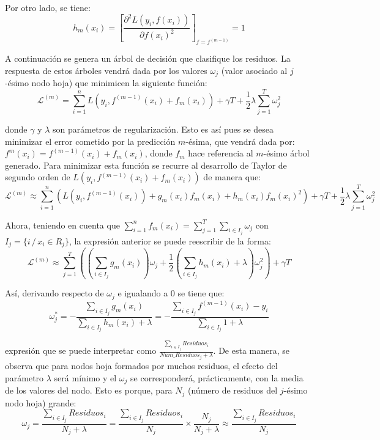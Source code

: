 \documentclass[12pt,twoside]{article}
\begin{document}
Por otro lado, se tiene:
\begin{equation*}
h_{m}(x_i) = \left[ \frac{\partial^2 L(y_i, f(x_i))}{\partial f(x_i)^2} \right]_{f = f^{(m-1)}} = 1
\end{equation*}

A continuación se genera un árbol de decisión que clasifique los residuos. La respuesta de estos árboles vendrá dada por los valores $\omega_j$ (valor asociado al $j$-ésimo nodo hoja) que minimicen la siguiente función:
\begin{equation*}
\mathcal{L}^{(m)} = \sum_{i=1}^n L(y_i, f^{(m-1)}(x_i) + f_m(x_i)) + \gamma T + \frac{1}{2}\lambda \sum_{j=1}^T \omega_j^2
\end{equation*}

\noindent
donde $\gamma$ y $\lambda$ son parámetros de regularización. Esto es así pues se desea minimizar el error cometido por la predicción $m$-ésima, que vendrá dada por: $f^m(x_i) = f^{(m-1)}(x_i) + f_m(x_i)$, donde $f_m$ hace referencia al $m$-ésimo árbol generado. Para minimizar esta función se recurre al desarrollo de Taylor de segundo orden de $L(y_i, f{^{(m-1)}}(x_i) + f_m(x_i))$ de manera que:
\begin{equation*}
\mathcal{L}^{(m)} \approx \sum_{i=1}^n \left( L(y_i, f^{(m-1)}(x_i)) + g_m(x_i)f_m(x_i) + h_m(x_i)f_m(x_i)^2 \right)  + \gamma T + \frac{1}{2}\lambda \sum_{j=1}^T \omega_j^2
\end{equation*}

Ahora, teniendo en cuenta que $ \displaystyle \sum_{i=1}^n f_m(x_i) = \sum_{j = 1}^T\sum_{i \in I_j} \omega_j$ con $I_j = \{ i \, / \, x_i \in R_j \}$, la expresión anterior se puede reescribir de la forma:
\begin{equation*}
\mathcal{L}^{(m)} \approx \sum_{j = 1}^T \left( (\sum_{i \in I_j} g_m(x_i))\omega_j + \frac{1}{2}(\sum_{i\in I_j} h_m(x_i) + \lambda)\omega_j^2 \right) + \gamma T
\end{equation*}

Así, derivando respecto de $\omega_j$ e igualando a 0 se tiene que:
\begin{equation*}
\omega_j^* = - \frac{\sum_{i \in I_j} g_m(x_i)}{\sum_{i \in I_j} h_m(x_i) + \lambda} = - \frac{\sum_{i \in I_j} f^{(m-1)}(x_i) - y_i}{\sum_{i \in I_j} 1 + \lambda}
\end{equation*}

\noindent
expresión que se puede interpretar como $\frac{\sum_{i \in I_j} Residuos_i}{Num\_Residuos_j + \lambda}$. De esta manera, se observa que para nodos hoja formados por muchos residuos, el efecto del parámetro $\lambda$ será mínimo y el $\omega_j$ se corresponderá, prácticamente, con la media de los valores del nodo. Esto es porque, para $N_j$ (número de residuos del $j$-ésimo nodo hoja) grande:
\begin{equation*}
\omega_j = \frac{\sum_{i \in I_j} Residuos_i}{N_j + \lambda} = \frac{\sum_{i \in I_j} Residuos_i}{N_j} \times \frac{N_j}{N_j + \lambda} \approx \frac{\sum_{i \in I_j} Residuos_i}{N_j}
\end{equation*}
\end{document}
